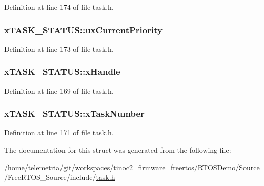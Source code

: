 Definition at line 174 of file task.\+h.

\subsubsection[{\texorpdfstring{ux\+Current\+Priority}{uxCurrentPriority}}]{ x\+T\+A\+S\+K\+\_\+\+S\+T\+A\+T\+U\+S\+::ux\+Current\+Priority}\hypertarget{structx_t_a_s_k___s_t_a_t_u_s_a39df647234fc0d6de5852042a2741a94}{}\label{structx_t_a_s_k___s_t_a_t_u_s_a39df647234fc0d6de5852042a2741a94}


Definition at line 173 of file task.\+h.

\subsubsection[{\texorpdfstring{x\+Handle}{xHandle}}]{ x\+T\+A\+S\+K\+\_\+\+S\+T\+A\+T\+U\+S\+::x\+Handle}\hypertarget{structx_t_a_s_k___s_t_a_t_u_s_ac57f825f365c3c64bba827285fe3c2a0}{}\label{structx_t_a_s_k___s_t_a_t_u_s_ac57f825f365c3c64bba827285fe3c2a0}


Definition at line 169 of file task.\+h.

\subsubsection[{\texorpdfstring{x\+Task\+Number}{xTaskNumber}}]{ x\+T\+A\+S\+K\+\_\+\+S\+T\+A\+T\+U\+S\+::x\+Task\+Number}\hypertarget{structx_t_a_s_k___s_t_a_t_u_s_acd44468ba37270b04f83d0833c098057}{}\label{structx_t_a_s_k___s_t_a_t_u_s_acd44468ba37270b04f83d0833c098057}


Definition at line 171 of file task.\+h.



The documentation for this struct was generated from the following file\+:\begin{DoxyCompactItemize}
\item 
/home/telemetria/git/workspaces/tinoc2\+\_\+firmware\+\_\+freertos/\+R\+T\+O\+S\+Demo/\+Source/\+Free\+R\+T\+O\+S\+\_\+\+Source/include/\hyperlink{task_8h}{task.\+h}\end{DoxyCompactItemize}
